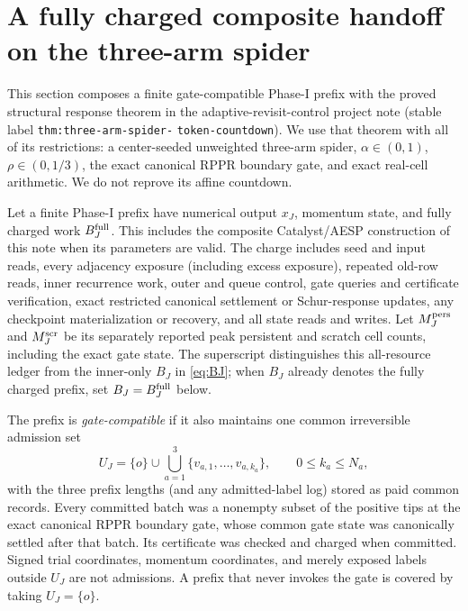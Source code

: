 \section{A fully charged composite handoff on the three-arm spider}
\label{sec:three-arm-composite-handoff}

This section composes a finite gate-compatible Phase-I prefix with the
proved structural response theorem in the adaptive-revisit-control project
note (stable label \texttt{thm:three-arm-spider-}\allowbreak
\texttt{token-countdown}). We use that theorem with all of its restrictions:
a center-seeded unweighted three-arm spider,
$\alpha\in(0,1)$, $\rho\in(0,1/3)$, the exact canonical RPPR boundary gate,
and exact real-cell arithmetic. We do not reprove its affine countdown.

\begin{definition}
\label{def:three-arm-gate-compatible-prefix}
Let a finite Phase-I prefix have numerical output $x_J$, momentum state, and
fully charged work $B_J^{\rm full}$. This includes the composite Catalyst/AESP
construction of this note when its parameters are valid. The charge includes
seed and input reads, every adjacency exposure (including excess exposure),
repeated old-row reads, inner recurrence work, outer and queue control, gate
queries and certificate verification, exact restricted canonical settlement
or Schur-response updates, any checkpoint materialization or recovery, and all
state reads and writes. Let $M_J^{\rm pers}$ and $M_J^{\rm scr}$ be its
separately reported peak persistent and scratch cell counts, including the
exact gate state.
The superscript distinguishes this all-resource ledger from the inner-only
$B_J$ in \cref{eq:BJ}; when $B_J$ already denotes the fully charged prefix,
set $B_J=B_J^{\rm full}$ below.

The prefix is \emph{gate-compatible} if it also maintains one common
irreversible admission set
\begin{equation}
 U_J=\{o\}\cup
 \bigcup_{a=1}^3\{v_{a,1},\ldots,v_{a,k_a}\},
 \qquad 0\leq k_a\leq N_a,
 \label{eq:three-arm-handoff-prefixes}
\end{equation}
with the three prefix lengths (and any admitted-label log) stored as paid
common records. Every committed batch was a nonempty subset of the positive
tips at the
exact canonical RPPR boundary gate, whose common gate state was canonically
settled after that batch. Its certificate was checked and charged when
committed. Signed trial coordinates, momentum coordinates, and merely
exposed labels outside $U_J$ are not admissions. A prefix that never invokes
the gate is covered by taking $U_J=\{o\}$.
\end{definition}

